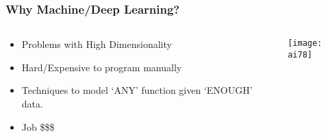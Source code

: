 \begin{frame}[fragile]\frametitle{Why Machine/Deep Learning?}

\begin{columns}
    \begin{column}[T]{0.6\linewidth}

\begin{itemize}
\item Problems with High Dimensionality
\item Hard/Expensive to program manually
\item Techniques to model `ANY' function given `ENOUGH' data.
\item Job \$\$\$
\end{itemize}

    \end{column}
    \begin{column}[T]{0.4\linewidth}

			\begin{center}
			\texttt{[image: ai78]}
			\end{center}
			
    \end{column}
  \end{columns}
  
  
  

\end{frame}



